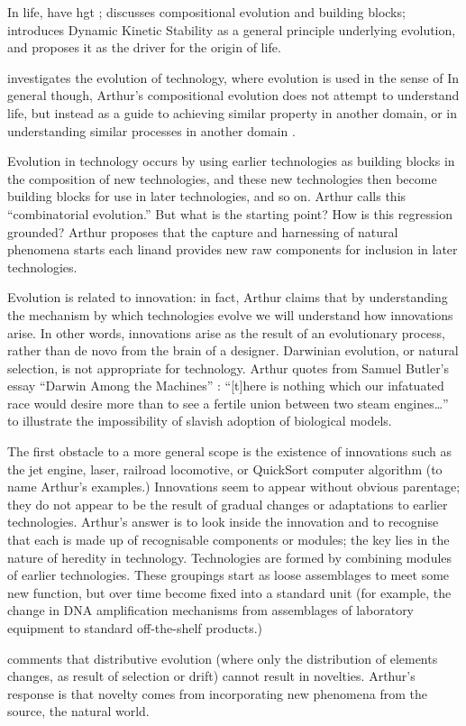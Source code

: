 \begin{NOTES}
In life, have \gls{hgt} \eg \parencite{Ochman2000}; \parencite{Watson2002} discusses compositional evolution and building blocks; \parencite{Pross2011} introduces Dynamic Kinetic Stability as a general principle underlying evolution, and proposes it as the driver for the origin of life.

\parencite{Arthur2009} investigates the evolution of technology, where evolution is used in the sense of  In general though, Arthur's compositional evolution does not attempt to understand life, but instead as a guide to achieving similar property in another domain, or in understanding similar processes in another domain \parencite{Arthur2009}.

Evolution in technology occurs by using earlier technologies as building blocks in the composition of new technologies, and these new technologies then become building blocks for use in later technologies, and so on. Arthur calls this ``combinatorial evolution.'' But what is the starting point? How is this regression grounded? Arthur proposes that the capture and harnessing of natural phenomena starts each lin\eg and provides new raw components for inclusion in later technologies.

Evolution is related to innovation: in fact, Arthur claims that by understanding the mechanism by which technologies evolve we will understand how innovations arise. In other words, innovations arise as the result of an evolutionary process, rather than de novo from the brain of a designer. Darwinian evolution, or natural selection, is not appropriate for technology. Arthur quotes from Samuel Butler's essay ``Darwin Among the Machines'' : ``{[}t{]}here is nothing which our infatuated race would desire more than to see a fertile union between two steam engines\ldots{}'' to illustrate the impossibility of slavish adoption of biological models.

The first obstacle to a more general scope is the existence of innovations such as the jet engine, laser, railroad locomotive, or QuickSort computer algorithm (to name Arthur's examples.) Innovations seem to appear without obvious parentage; they do not appear to be the result of gradual changes or adaptations to earlier technologies. Arthur's answer is to look inside the innovation and to recognise that each is made up of recognisable components or modules; the key lies in the nature of heredity in technology. Technologies are formed by combining modules of earlier technologies. These groupings start as loose assemblages to meet some new function, but over time become fixed into a standard unit (for example, the change in DNA amplification mechanisms from assemblages of laboratory equipment to standard off-the-shelf products.)

\parencite{Bourrat2015} comments that distributive evolution (where only the distribution of elements changes, as result of selection or drift) cannot result in novelties. Arthur's response is that novelty comes from incorporating new phenomena from the source, the natural world.
\end{NOTES}

